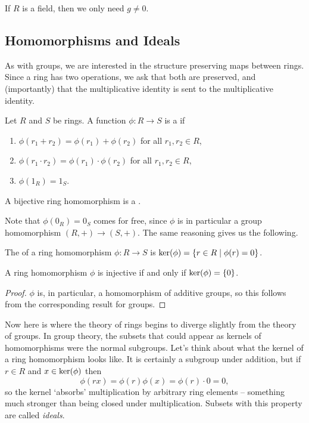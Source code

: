 \documentclass[a4paper]{scrartcl}
\begin{document}
\begin{remark}
	If $R$ is a field, then we only need $g \neq 0$.
\end{remark}

\subsection{Homomorphisms and Ideals}

As with groups, we are interested in the structure preserving maps between rings. Since a ring has two operations, we ask that both are preserved, and (importantly) that the multiplicative identity is sent to the multiplicative identity.

\begin{definition}
	Let $R$ and $S$ be rings. A function $\phi: R \rightarrow S$ is a  if
	\begin{enumerate}[label=(\roman*)]
		\item $\phi(r_1 + r_2) = \phi(r_1) + \phi(r_2)$ for all $r_1, r_2 \in R$,
		\item $\phi(r_1 \cdot r_2) = \phi(r_1) \cdot \phi(r_2)$ for all $r_1, r_2 \in R$,
		\item $\phi(1_R) = 1_S$.
	\end{enumerate}
	A bijective ring homomorphism is a .
\end{definition}

Note that $\phi(0_R) = 0_S$ comes for free, since $\phi$ is in particular a group homomorphism $(R, +) \rightarrow (S, +)$. The same reasoning gives us the following.

\begin{definition}[Kernel]
	The  of a ring homomorphism $\phi : R \rightarrow S$ is $\operatorname{ker}(\phi) = \{r \in R \mid \phi(r) = 0\}$.
\end{definition}

\begin{lemma}
	A ring homomorphism $\phi$ is injective if and only if $\operatorname{ker}(\phi) = \{0\}$.
\end{lemma}
\begin{proof}
	$\phi$ is, in particular, a homomorphism of additive groups, so this follows from the corresponding result for groups.
\end{proof}

Now here is where the theory of rings begins to diverge slightly from the theory of groups. In group theory, the subsets that could appear as kernels of homomorphisms were the normal subgroups. Let's think about what the kernel of a ring homomorphism looks like. It is certainly a subgroup under addition, but if $r \in R$ and $x \in \operatorname{ker}(\phi)$ then
$$
\phi(rx) = \phi(r)\phi(x) = \phi(r) \cdot 0 = 0,
$$
so the kernel `absorbs' multiplication by arbitrary ring elements -- something much stronger than being closed under multiplication. Subsets with this property are called \emph{ideals}.
\end{document}
